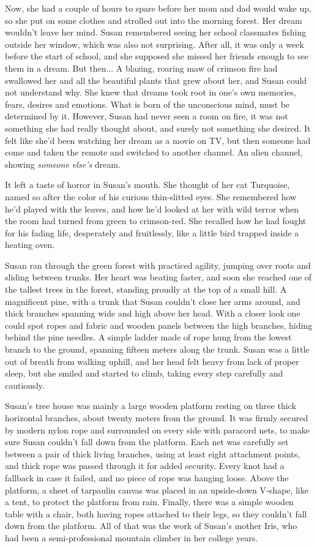 \documentclass[openany, oneside]{book}
\begin{document}
Now, she had a couple of hours to spare before her mom and dad would wake up, so she put on some clothes and strolled out into the morning forest.
Her dream wouldn't leave her mind. 
Susan remembered seeing her school classmates fishing outside her window, which was also not surprising.
After all, it was only a week before the start of school, and she supposed she missed her friends enough to see them in a dream. 
But then...
A blazing, roaring maw of crimson fire had swallowed her and all the beautiful plants that grew about her, and Susan could not understand why.
She knew that dreams took root in one's own memories, fears, desires and emotions.
What is born of the unconscious mind, must be determined by it.
However, Susan had never seen a room on fire, it was not something she had really thought about, and surely not something she desired.
It felt like she'd been watching her dream as a movie on TV, but then someone had come and taken the remote and switched to another channel.
An alien channel, showing \emph{someone else's} dream.

It left a taste of horror in Susan's mouth.
She thought of her cat Turquoise, named so after the color of his curious thin-slitted eyes.
She remembered how he'd played with the leaves, and how he'd looked at her with wild terror when the room had turned from green to crimson-red.
She recalled how he had fought for his fading life, desperately and fruitlessly, like a little bird trapped inside a heating oven.

Susan ran through the green forest with practiced agility, jumping over roots and sliding between trunks.
Her heart was beating faster, and soon she reached one of the tallest trees in the forest, standing proudly at the top of a small hill.
A magnificent pine, with a trunk that Susan couldn't close her arms around, and thick branches spanning wide and high above her head.
With a closer look one could spot ropes and fabric and wooden panels between the high branches, hiding behind the pine needles.
A simple ladder made of rope hung from the lowest branch to the ground, spanning fifteen meters along the trunk.
Susan was a little out of breath from walking uphill, and her head felt heavy from lack of proper sleep, but she smiled and started to climb, taking every step carefully and cautiously.

Susan's tree house was mainly a large wooden platform resting on three thick horizontal branches, about twenty meters from the ground.
It was firmly secured by modern nylon rope and surrounded on every side with paracord nets, to make sure Susan couldn't fall down from the platform.
Each net was carefully set between a pair of thick living branches, using at least eight attachment points, and thick rope was passed through it for added security.
Every knot had a fallback in case it failed, and no piece of rope was hanging loose.
Above the platform, a sheet of tarpaulin canvas was placed in an upside-down V-shape, like a tent, to protect the platform from rain.
Finally, there was a simple wooden table with a chair, both having ropes attached to their legs, so they couldn't fall down from the platform.
All of that was the work of Susan's mother Iris, who had been a semi-professional mountain climber in her college years.
\end{document}
